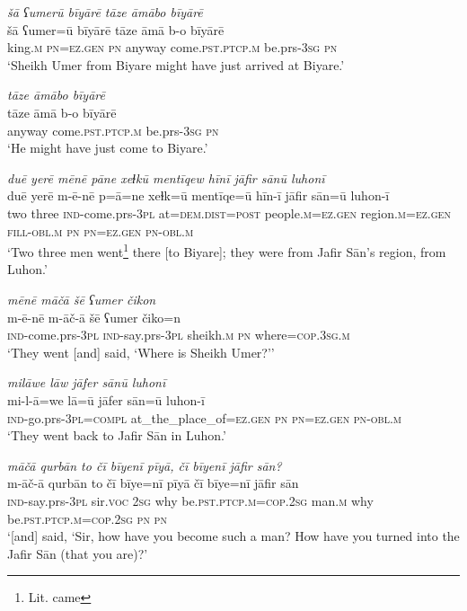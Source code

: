 \ea \label{ŠJ.2}
\textit{šā ʕumerū bīyārē tāze āmābo bīyārē} \\ 
\gll šā ʕumer=ū bīyārē tāze āmā b-o bīyārē \\ 
 king\textsc{.m} \textsc{pn}\textsc{=ez.gen} \textsc{pn} anyway come\textsc{.pst}\textsc{.ptcp}\textsc{.m} be.prs\textsc{-3sg} \textsc{pn} \\ 
\glt `Sheikh Umer from Biyare might have just arrived at Biyare.'
\z 
 
\ea \label{ŠJ.3}
\textit{tāze āmābo bīyārē} \\ 
\gll tāze āmā b-o bīyārē \\ 
 anyway come\textsc{.pst}\textsc{.ptcp}\textsc{.m} be.prs\textsc{-3sg} \textsc{pn} \\ 
\glt `He might have just come to Biyare.'
\z 
 
\ea \label{ŠJ.9}
\textit{duē yerē mēnē pāne xeɫkū mentīqew hīnī jāfir sānū luhonī} \\ 
\gll duē yerē m-ē-nē p=ā=ne xeɫk=ū mentīqe=ū hīn-ī jāfir sān=ū luhon-ī \\ 
 two three \textsc{ind-}come.prs\textsc{-3pl} at=\textsc{dem.dist}\textsc{=\textsc{post}} people\textsc{.m}\textsc{=ez.gen} region\textsc{.m}\textsc{=ez.gen} \textsc{fill}\textsc{-obl}\textsc{.m} \textsc{pn} \textsc{pn}\textsc{=ez.gen} \textsc{pn}\textsc{-obl}\textsc{.m} \\ 
\glt `Two three men went\footnote{Lit. came} there [to Biyare]; they were from Jafir Sān’s region, from Luhon.'
\z 
 
\ea \label{ŠJ.10}
\textit{mēnē māčā šē ʕumer čikon} \\ 
\gll m-ē-nē m-āč-ā šē ʕumer čiko=n \\ 
 \textsc{ind-}come.prs\textsc{-3pl} \textsc{ind-}say.prs\textsc{-3pl} sheikh\textsc{.m} \textsc{pn} where\textsc{=cop}\textsc{.3sg}\textsc{.m} \\ 
\glt `They went [and] said, ‘Where is Sheikh Umer?’'
\z 
 
\ea \label{ŠJ.13}
\textit{milāwe lāw jāfer sānū luhonī} \\ 
\gll mi-l-ā=we lā=ū jāfer sān=ū luhon-ī \\ 
 \textsc{ind-}go.prs\textsc{-3pl}\textsc{=compl} at\_the\_place\_of\textsc{=ez.gen} \textsc{pn} \textsc{pn}\textsc{=ez.gen} \textsc{pn}\textsc{-obl}\textsc{.m} \\ 
\glt `They went back to Jafir Sān in Luhon.'
\z 
 
\ea \label{ŠJ.14}
\textit{māčā qurbān to čī bīyenī pīyā, čī bīyenī jāfir sān?} \\ 
\gll m-āč-ā qurbān to čī bīye=nī pīyā čī bīye=nī jāfir sān \\ 
 \textsc{ind-}say.prs\textsc{-3pl} sir.\textsc{voc} \textsc{2sg} why be\textsc{.pst}\textsc{.ptcp}\textsc{.m}\textsc{=cop}\textsc{.\textsc{2sg}} man\textsc{.m} why be\textsc{.pst}\textsc{.ptcp}\textsc{.m}\textsc{=cop}\textsc{.\textsc{2sg}} \textsc{pn} \textsc{pn} \\ 
\glt `[and] said, ‘Sir, how have you become such a man? How have you turned into the Jafir Sān (that you are)?'
\z 
 
